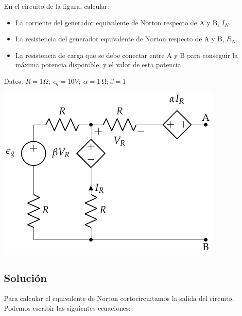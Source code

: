 En el circuito de la figura, calcular:
\begin{itemize}
\item La corriente del generador equivalente de Norton respecto de A y
  B, $I_N$.
\item La resistencia del generador equivalente de Norton respecto de A
  y B, $R_N$.
\item La resistencia de carga que se debe conectar entre A y B para
  conseguir la máxima potencia disponible, y el valor de esta
  potencia.
\end{itemize}

Datos: $R = {1}{\Omega};\; \epsilon_g = {10}{V};\; \alpha = \qty{1}{\ohm}; \beta = 1$

\begin{center}
  \includegraphics{figuras/norton.pdf}
\end{center}

\subsection*{Solución}
Para calcular el equivalente de Norton cortocircuitamos la salida del circuito. Podemos escribir las siguientes ecuaciones:

